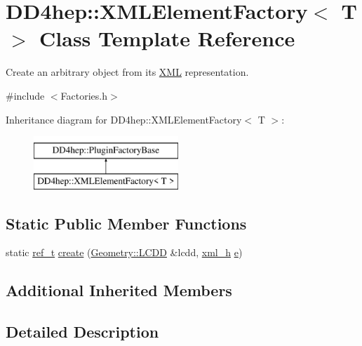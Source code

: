 \hypertarget{class_d_d4hep_1_1_x_m_l_element_factory}{}\section{D\+D4hep\+:\+:X\+M\+L\+Element\+Factory$<$ T $>$ Class Template Reference}
\label{class_d_d4hep_1_1_x_m_l_element_factory}


Create an arbitrary object from it\textquotesingle{}s \hyperlink{namespace_d_d4hep_1_1_x_m_l}{X\+ML} representation.  




{\ttfamily \#include $<$Factories.\+h$>$}

Inheritance diagram for D\+D4hep\+:\+:X\+M\+L\+Element\+Factory$<$ T $>$\+:\begin{figure}[H]
\begin{center}
\leavevmode
\includegraphics[height=2.000000cm]{class_d_d4hep_1_1_x_m_l_element_factory}
\end{center}
\end{figure}
\subsection*{Static Public Member Functions}
\begin{DoxyCompactItemize}
\item 
static \hyperlink{struct_d_d4hep_1_1_plugin_factory_base_ab13458952a5b4a91f5130d3ee4db4d33}{ref\+\_\+t} \hyperlink{class_d_d4hep_1_1_x_m_l_element_factory_ae05e7a1e9fad323da9527efc778a9cd4}{create} (\hyperlink{class_d_d4hep_1_1_geometry_1_1_l_c_d_d}{Geometry\+::\+L\+C\+DD} \&lcdd, \hyperlink{struct_d_d4hep_1_1_plugin_factory_base_aedebe6835e2705756763812545bcb8fd}{xml\+\_\+h} \hyperlink{_volumes_8cpp_a8a9a1f93e9b09afccaec215310e64142}{e})
\end{DoxyCompactItemize}
\subsection*{Additional Inherited Members}


\subsection{Detailed Description}
